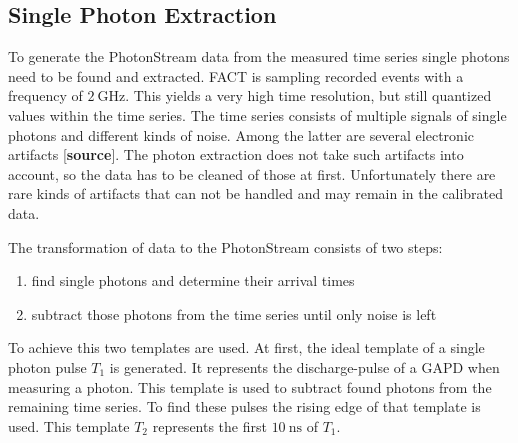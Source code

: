 \subsection{Single Photon Extraction}
%
To generate the PhotonStream data from the measured time series single photons
need to be found and extracted. FACT is sampling recorded events with a
frequency of $\SI{2}{\giga\hertz}$. This yields a very high time resolution, but still quantized values within the time series. The time series consists of multiple signals
of single photons and different kinds of noise. Among the latter are several
electronic artifacts [\textbf{source}]. The photon extraction does not take such artifacts into
account, so the data has to be cleaned of those at first. Unfortunately there
are rare kinds of artifacts that can not be handled and may remain in the
calibrated data.

The transformation of data to the PhotonStream consists of two steps:
%
\begin{enumerate}
  \item find single photons and determine their arrival times
  \item subtract those photons from the time series until only noise is left
\end{enumerate}
%
To achieve this two templates are used. At first, the ideal template of a
single photon pulse $T_1$ is generated. It represents the discharge-pulse of a
GAPD when measuring a photon. This template is used to subtract found photons
from the remaining time series. To find these pulses the rising edge of that
template is used. This template $T_2$ represents the first
$\SI{10}{\nano\second}$ of $T_1$.

